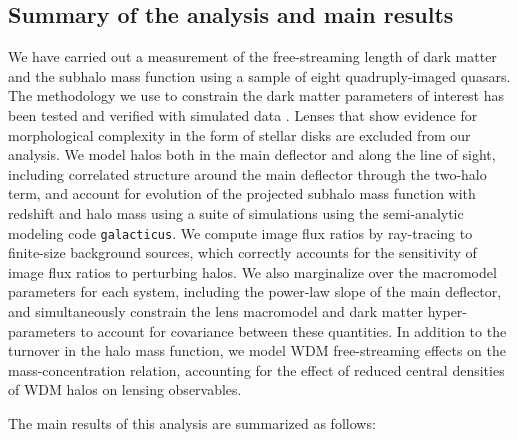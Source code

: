 \subsection{Summary of the analysis and main results}
\label{ssec:mainsummary}
We have carried out a measurement of the free-streaming length of dark matter and the subhalo mass function using a sample of eight quadruply-imaged quasars. The methodology we use to constrain the dark matter parameters of interest has been tested and verified with simulated data \cite{Gilman++19}. Lenses that show evidence for morphological complexity in the form of stellar disks are excluded from our analysis. We model halos both in the main deflector and along the line of sight, including correlated structure around the main deflector through the two-halo term, and account for evolution of the projected subhalo mass function with redshift and halo mass using a suite of simulations using the semi-analytic modeling code {\tt{galacticus}}. We compute image flux ratios by ray-tracing to finite-size background sources, which correctly accounts for the sensitivity of image flux ratios to perturbing halos. We also marginalize over the macromodel parameters for each system, including the power-law slope of the main deflector, and simultaneously constrain the lens macromodel and dark matter hyper-parameters to account for covariance between these quantities. In addition to the turnover in the halo mass function, we model WDM free-streaming effects on the mass-concentration relation, accounting for the effect of reduced central densities of WDM halos on lensing observables. 

The main results of this analysis are summarized as follows:

